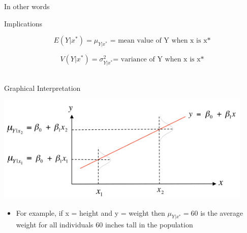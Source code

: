 \documentclass[australian,ignorenonframetext,aspectratio=169]{beamer}
\providecommand{\tightlist}{%
  \setlength{\itemsep}{0pt}\setlength{\parskip}{0pt}}
\begin{document}
\begin{frame}{In other words}
\protect\hypertarget{in-other-words-2}{}


\end{frame}

\begin{frame}{Implications}
\protect\hypertarget{implications}{}


\[E(Y|x^*) = \mu_{Y|x^*}\text{ = mean value of Y when x is x*}\]

\[V(Y|x^*) = \sigma^2_{Y|x^*}\text{= variance of Y when x is x*}\] ~

\end{frame}

\begin{frame}{Graphical Interpretation}
\protect\hypertarget{graphical-interpretation}{}

\includegraphics[width=4.83in]{../graphs/regression}

\begin{itemize}
\tightlist
\item
  For example, if x = height and y = weight then \(\mu_{Y|x^*}=60\) is
  the average weight for all individuals 60 inches tall in the
  population
\end{itemize}

\end{frame}
\end{document}
